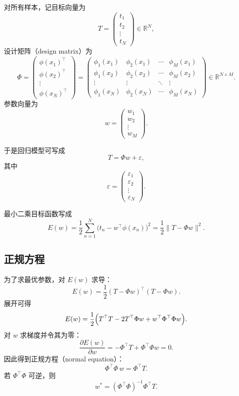 对所有样本，记目标向量为
\[
T=
\begin{pmatrix}
t_1\\
t_2\\
\vdots\\
t_N
\end{pmatrix}
\in\mathbb{R}^{N},
\]
设计矩阵（design matrix）为
\[
\Phi=
\begin{pmatrix}
\phi(x_1)^{\top}\\
\phi(x_2)^{\top}\\
\vdots\\
\phi(x_N)^{\top}
\end{pmatrix}
=
\begin{pmatrix}
\phi_1(x_1) & \phi_2(x_1) & \cdots & \phi_M(x_1)\\
\phi_1(x_2) & \phi_2(x_2) & \cdots & \phi_M(x_2)\\
\vdots & \vdots & \ddots & \vdots\\
\phi_1(x_N) & \phi_2(x_N) & \cdots & \phi_M(x_N)
\end{pmatrix}
\in\mathbb{R}^{N\times M}.
\]
参数向量为
\[
w=
\begin{pmatrix}
w_1\\
w_2\\
\vdots\\
w_M
\end{pmatrix}.
\]

于是回归模型可写成
\[
T=\Phi w+\varepsilon,
\]
其中
\[
\varepsilon=
\begin{pmatrix}
\varepsilon_1\\
\varepsilon_2\\
\vdots\\
\varepsilon_N
\end{pmatrix}.
\]

最小二乘目标函数写成
\[
E(w)
=
\frac{1}{2}\sum_{n=1}^N \bigl(t_n-w^{\top}\phi(x_n)\bigr)^2
=
\frac{1}{2}\|T-\Phi w\|^2.
\] 

\subsection{正规方程}

为了求最优参数，对 $E(w)$ 求导：
\[
E(w)=\frac{1}{2}(T-\Phi w)^{\top}(T-\Phi w).
\]
展开可得
\[
E(w)
=
\frac{1}{2}\Bigl(
T^{\top}T
-2T^{\top}\Phi w
+w^{\top}\Phi^{\top}\Phi w
\Bigr).
\]
对 $w$ 求梯度并令其为零：
\[
\frac{\partial E(w)}{\partial w}
=
-\Phi^{\top}T+\Phi^{\top}\Phi w
=0.
\]
因此得到正规方程（normal equation）：
\[
\Phi^{\top}\Phi\,w=\Phi^{\top}T.
\]
若 $\Phi^{\top}\Phi$ 可逆，则
\[
w^{*}
=
(\Phi^{\top}\Phi)^{-1}\Phi^{\top}T.
\]

